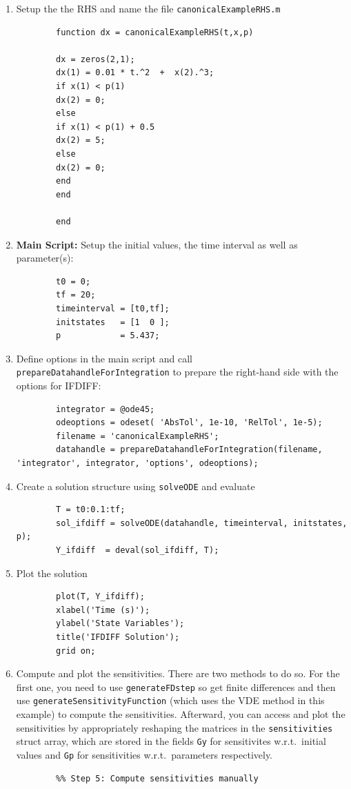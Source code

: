 \begin{enumerate}
	\item Setup the the RHS and name the file \lstinline!canonicalExampleRHS.m!
	\begin{lstlisting}
		function dx = canonicalExampleRHS(t,x,p)
		
		dx = zeros(2,1);
		dx(1) = 0.01 * t.^2  +  x(2).^3;
		if x(1) < p(1)
		dx(2) = 0;
		else
		if x(1) < p(1) + 0.5
		dx(2) = 5;
		else
		dx(2) = 0;
		end
		end
		
		end
	\end{lstlisting}
	
	\item \textbf{Main Script:}
	Setup the initial values, the time interval as well as parameter(s):
	\begin{lstlisting}
		t0 = 0;
		tf = 20;
		timeinterval = [t0,tf];
		initstates   = [1  0 ];
		p            = 5.437;
	\end{lstlisting}
	\item Define options in the main script and call \verb|prepareDatahandleForIntegration| to prepare the right-hand side with the options for IFDIFF:
	\begin{lstlisting}
		integrator = @ode45;
		odeoptions = odeset( 'AbsTol', 1e-10, 'RelTol', 1e-5);
		filename = 'canonicalExampleRHS';
		datahandle = prepareDatahandleForIntegration(filename, 'integrator', integrator, 'options', odeoptions);
	\end{lstlisting}
	\item Create a solution structure using \verb|solveODE| and evaluate
	\begin{lstlisting}
		T = t0:0.1:tf;
		sol_ifdiff = solveODE(datahandle, timeinterval, initstates, p);
		Y_ifdiff  = deval(sol_ifdiff, T);
	\end{lstlisting}
	\item Plot the solution
	\begin{lstlisting}
		plot(T, Y_ifdiff); 
		xlabel('Time (s)');
		ylabel('State Variables');
		title('IFDIFF Solution');
		grid on;
	\end{lstlisting}
	\item Compute and plot the sensitivities. There are two methods to do so. For the first one, you need to use \lstinline!generateFDstep! so get finite differences and then use \lstinline!generateSensitivityFunction! (which uses the VDE method in this example) to compute the sensitivities. Afterward, you can access and plot the sensitivities by appropriately reshaping the matrices in the \lstinline!sensitivities! struct array, which are stored in the fields \lstinline!Gy! for sensitivites w.r.t.~initial values and \lstinline!Gp! for sensitivities w.r.t.~parameters respectively. 
	\begin{lstlisting}
		%% Step 5: Compute sensitivities manually
		

\end{lstlisting}
\end{enumerate}
